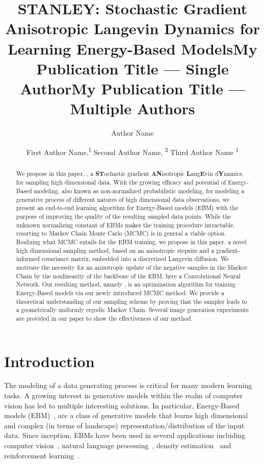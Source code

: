 \documentclass[letterpaper]{article} %
\title{STANLEY: Stochastic Gradient Anisotropic Langevin Dynamics for Learning Energy-Based Models}
\title{My Publication Title --- Single Author}
\author {
    Author Name
}
\title{My Publication Title --- Multiple Authors}
\author {
    First Author Name,\textsuperscript{\rm 1}
    Second Author Name, \textsuperscript{\rm 2}
    Third Author Name \textsuperscript{\rm 1}
}
\begin{document}
\maketitle

\begin{abstract}\vspace{-0.1in}
We propose in this paper, \textbf{\algo}, a \textbf{ST}ochastic gradient \textbf{AN}isotropic \textbf{L}ang\textbf{E}vin d\textbf{Y}namics, for sampling high dimensional data.
With the growing efficacy and potential of Energy-Based modeling, also known as non-normalized probabilistic modeling, for modeling a generative process of different natures of high dimensional data observations, we present an end-to-end learning algorithm for Energy-Based models (EBM) with the purpose of improving the quality of the resulting sampled data points.
While the unknown normalizing constant of EBMs makes the training procedure intractable, resorting to Markov Chain Monte Carlo (MCMC) is in general a viable option.
Realizing what MCMC entails for the EBM training, we propose in this paper, a novel high dimensional sampling method, based on an anisotropic stepsize and a gradient-informed covariance matrix, embedded into a discretized Langevin diffusion.
We motivate the necessity for an anisotropic update of the negative samples in the Markov Chain by the nonlinearity of the backbone of the EBM, here a Convolutional Neural Network.
Our resulting method, namely \algo, is an optimization algorithm for training Energy-Based models via our newly introduced MCMC method.
We provide a theoretical understanding of our sampling scheme by proving that the sampler leads to a geometrically uniformly ergodic Markov Chain.
Several image generation experiments are provided in our paper to show the effectiveness of our method.
\end{abstract}

\vspace{-0.15in}
\section{Introduction}
The modeling of a data generating process is critical for many modern learning tasks.
A growing interest in generative models within the realm of computer vision has led to multiple interesting solutions.
In particular, Energy-Based models (EBM)~\cite{zhu1998filters,lecun2006tutorial}, are a class of generative models that learns high dimensional and complex (in terms of landscape) representation/distribution of the input data.
Since inception, EBMs have been used in several applications including computer vision~\cite{ngiam2011learning, xie2016theory,du2019implicit}, natural language processing~\cite{mikolov2013distributed,deng2020residual},  density estimation~\cite{wenliang2019learning,song2020sliced} and reinforcement learning~\cite{haarnoja2017reinforcement}.
\end{document}
